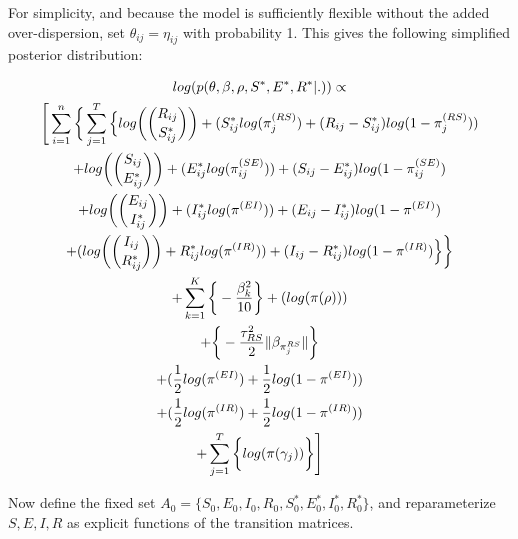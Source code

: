 \documentclass[12pt]{article}
\begin{document}
For simplicity, and because the model is sufficiently flexible without the added over-dispersion, set $\theta_{ij} = \eta_{ij}$ with probability 1. This 
gives the following simplified posterior distribution:

\begin{center}
\begin{multline}
\displaystyle
log(p(\theta,\beta,\rho,S^*,E^*,R^*|.)) \propto \\
\Bigg[ \sum_{i=1}^n \bigg\{ \sum_{j=1}^T
        \Big\{
            log\bigg(\dbinom{R_{ij}}{S^*_{ij}}\bigg) + (S^*_{ij}log(\pi_j^{(RS)}) + (R_{ij} - S^*_{ij})log(1-\pi_j^{(RS)})) \\
            + log\bigg(\dbinom{S_{ij}}{E^*_{ij}}\bigg) + (E^*_{ij}log(\pi_{ij}^{(SE)})) + (S_{ij} - E^*_{ij})log(1-\pi_{ij}^{(SE)}) \\
            + log\bigg(\dbinom{E_{ij}}{I^*_{ij}}\bigg) + (I^*_{ij}log(\pi^{(EI)})) + (E_{ij} - I^*_{ij})log(1-\pi^{(EI)}) \\
            + (log\bigg(\dbinom{I_{ij}}{R^*_{ij}}\bigg) + R^*_{ij}log(\pi^{(IR)})) + (I_{ij} - R^*_{ij})log(1-\pi^{(IR)}) \Big\}\bigg\} \\
    + \sum_{k = 1}^K\bigg\{-\frac{\beta^2_k}{10}\bigg\}
            + (log(\pi(\rho)))\\
            +  \bigg\{ -\frac{\tau^2_{RS}}{2}\|\beta_{\pi_j^{RS}}\|  \bigg\} \\ 
            + (\frac{1}{2}log(\pi^{(EI)}) + \frac{1}{2}log(1-\pi^{(EI)})) \\
            + (\frac{1}{2}log(\pi^{(IR)}) + \frac{1}{2}log(1-\pi^{(IR)})) \\
            + \sum_{j=1}^{T} \bigg\{ log(\pi(\gamma_j)) \bigg\}\Bigg]\\
\end{multline}
\end{center}

Now define the fixed set $A_0 = \{S_0, E_0, I_0, R_0, S^*_0, E^*_0, I^*_0, R^*_0\}$,
and reparameterize $S, E, I, R$ as explicit functions of the transition matrices. 
\end{document}

